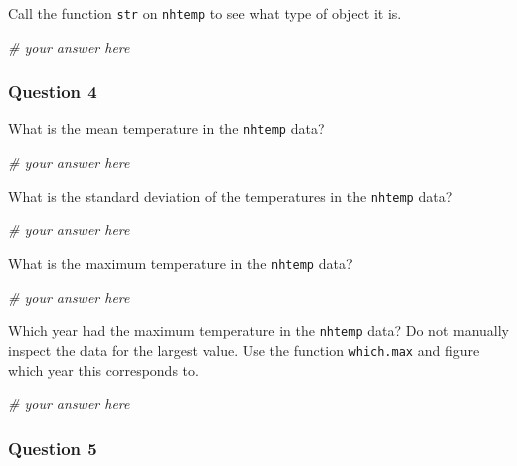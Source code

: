 \documentclass[
]{article}
\newenvironment{Shaded}{\begin{snugshade}}{\end{snugshade}}
\newcommand{\CommentTok}[1]{\textcolor[rgb]{0.56,0.35,0.01}{\textit{#1}}}
\begin{document}
Call the function \texttt{str} on \texttt{nhtemp} to see what type of
object it is.

\begin{Shaded}
\begin{Highlighting}[]
\CommentTok{\# your answer here}
\end{Highlighting}
\end{Shaded}

\newpage

\hypertarget{question-4}{%
\subsubsection{Question 4}\label{question-4}}

What is the mean temperature in the \texttt{nhtemp} data?

\begin{Shaded}
\begin{Highlighting}[]
\CommentTok{\# your answer here}
\end{Highlighting}
\end{Shaded}

What is the standard deviation of the temperatures in the
\texttt{nhtemp} data?

\begin{Shaded}
\begin{Highlighting}[]
\CommentTok{\# your answer here}
\end{Highlighting}
\end{Shaded}

What is the maximum temperature in the \texttt{nhtemp} data?

\begin{Shaded}
\begin{Highlighting}[]
\CommentTok{\# your answer here}
\end{Highlighting}
\end{Shaded}

Which year had the maximum temperature in the \texttt{nhtemp} data? Do
not manually inspect the data for the largest value. Use the function
\texttt{which.max} and figure which year this corresponds to.

\begin{Shaded}
\begin{Highlighting}[]
\CommentTok{\# your answer here}
\end{Highlighting}
\end{Shaded}

\newpage

\hypertarget{question-5}{%
\subsubsection{Question 5}\label{question-5}}
\end{document}
